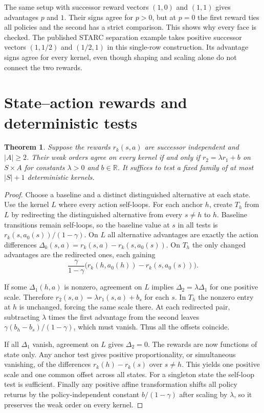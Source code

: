 \documentclass[11pt,a4paper]{amsart}
\newtheorem{theorem}{Theorem}
\newcommand{\R}{\mathbb R}
\begin{document}
The same setup with successor reward vectors $(1,0)$ and $(1,1)$ gives advantages $p$ and $1$. Their signs agree for $p>0$, but at $p=0$ the first reward ties all policies and the second has a strict comparison. This shows why every face is checked. The published STARC separation example \cite[Theorem~5]{starc} takes positive successor vectors $(1,1/2)$ and $(1/2,1)$ in this single-row construction. Its advantage signs agree for every kernel, even though shaping and scaling alone do not connect the two rewards.

\section{State--action rewards and deterministic tests}
\begin{theorem}\label{thm:affine}
Suppose the rewards $r_k(s,a)$ are successor independent and $|A|\geq2$. Their weak orders agree on every kernel if and only if $r_2=\lambda r_1+b$ on $S\times A$ for constants $\lambda>0$ and $b\in\R$. It suffices to test a fixed family of at most $|S|+1$ deterministic kernels.
\end{theorem}
\begin{proof}
Choose a baseline and a distinct distinguished alternative at each state. Use the kernel $L$ where every action self-loops. For each anchor $h$, create $T_h$ from $L$ by redirecting the distinguished alternative from every $s\ne h$ to $h$. Baseline transitions remain self-loops, so the baseline value at $s$ in all tests is $r_k(s,a_0(s))/(1-\gamma)$. On $L$ all alternative advantages are exactly the action differences $\Delta_k(s,a)=r_k(s,a)-r_k(s,a_0(s))$. On $T_h$ the only changed advantages are the redirected ones, each gaining
\[
 \frac{\gamma}{1-\gamma}\bigl(r_k(h,a_0(h))-r_k(s,a_0(s))\bigr).
\]

If some $\Delta_1(h,a)$ is nonzero, agreement on $L$ implies $\Delta_2=\lambda\Delta_1$ for one positive scale. Therefore $r_2(s,a)=\lambda r_1(s,a)+b_s$ for each $s$. In $T_h$ the nonzero entry at $h$ is unchanged, forcing the same scale there. At each redirected pair, subtracting $\lambda$ times the first advantage from the second leaves $\gamma(b_h-b_s)/(1-\gamma)$, which must vanish. Thus all the offsets coincide.

If all $\Delta_1$ vanish, agreement on $L$ gives $\Delta_2=0$. The rewards are now functions of state only. Any anchor test gives positive proportionality, or simultaneous vanishing, of the differences $r_k(h)-r_k(s)$ over $s\ne h$. This yields one positive scale and one common offset across all states. For a singleton state the self-loop test is sufficient. Finally any positive affine transformation shifts all policy returns by the policy-independent constant $b/(1-\gamma)$ after scaling by $\lambda$, so it preserves the weak order on every kernel.
\end{proof}
\end{document}

